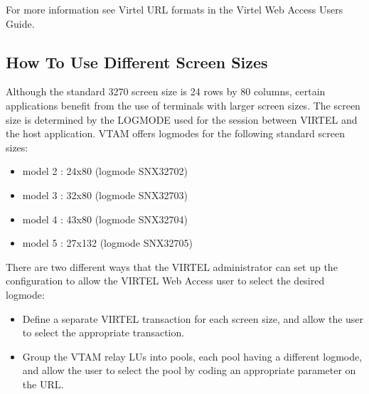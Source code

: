 \documentclass[letterpaper,10pt,english]{sphinxmanual}
\begin{document}
\sphinxAtStartPar
{}

\sphinxAtStartPar
{}

\sphinxAtStartPar
For more information see Virtel URL formats in the Virtel Web Access Users Guide.

\ignorespaces 

\subsection{How To Use Different Screen Sizes}
\label{\detokenize{Customization:how-to-use-different-screen-sizes}}\label{\detokenize{Customization:index-60}}
\sphinxAtStartPar
Although the standard 3270 screen size is 24 rows by 80 columns, certain applications benefit from the use of terminals with larger screen sizes. The screen size is determined by the LOGMODE used for the session between VIRTEL and the host application. VTAM offers logmodes for the following standard screen sizes:
\begin{itemize}
\item {} 
\sphinxAtStartPar
model 2 : 24x80 (logmode SNX32702)

\item {} 
\sphinxAtStartPar
model 3 : 32x80 (logmode SNX32703)

\item {} 
\sphinxAtStartPar
model 4 : 43x80 (logmode SNX32704)

\item {} 
\sphinxAtStartPar
model 5 : 27x132 (logmode SNX32705)

\end{itemize}

\sphinxAtStartPar
There are two different ways that the VIRTEL administrator can set up the configuration to allow the VIRTEL Web Access user to select the desired logmode:
\begin{itemize}
\item {} 
\sphinxAtStartPar
Define a separate VIRTEL transaction for each screen size, and allow the user to select the appropriate transaction.

\item {} 
\sphinxAtStartPar
Group the VTAM relay LUs into pools, each pool having a different logmode, and allow the user to select the pool by coding an appropriate parameter on the URL.

\end{itemize}
\end{document}
